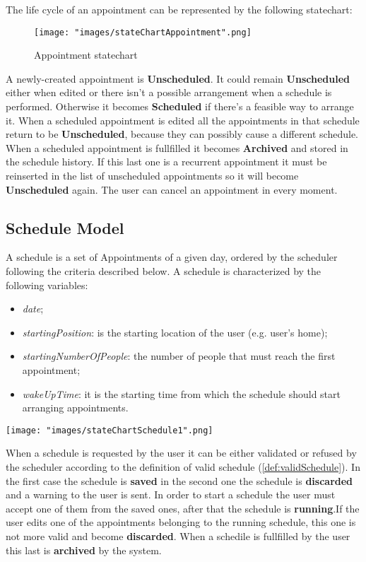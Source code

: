 The life cycle of an appointment can be represented by the following statechart:
\begin{figure}[H]
\begin{center}
\texttt{[image: "images/stateChartAppointment".png]}
\caption{Appointment statechart}
\label{fig:stchartApp}
\end{center}
\end{figure}

A newly-created appointment is \textbf{Unscheduled}. It could remain \textbf{Unscheduled} either when edited or there isn't a possible arrangement when a schedule is performed. Otherwise it becomes \textbf{Scheduled} if there's a feasible way to arrange it. When a scheduled appointment is edited all the appointments in that schedule return to be \textbf{Unscheduled}, because they can possibly cause a different schedule. When a scheduled appointment is fullfilled it becomes \textbf{Archived} and stored in the schedule history. If this last one is a recurrent appointment it must be reinserted in the list of unscheduled appointments so it will become \textbf{Unscheduled} again. The user can cancel an appointment in every moment. 

\subsection{Schedule Model} \label{subsect:schmodel}
A schedule is a set of Appointments of a  given day, ordered by the scheduler following the criteria described below.
A schedule is characterized by the following variables:
\begin{itemize}
\item \textit{date};
\item \textit{startingPosition}: is the starting location of the user (e.g. user's home);
\item \textit{startingNumberOfPeople}: the number of people that must reach the first appointment;
\item \textit{wakeUpTime}: it is the starting time from which the schedule should start arranging appointments.
\end{itemize}

\texttt{[image: "images/stateChartSchedule1".png]}

When a schedule is requested by the user it can be either validated or refused by the scheduler according to the definition of valid schedule (\ref{def:validSchedule}).
In the first case the schedule is \textbf{saved} in the second one the schedule is \textbf{discarded} and a warning to the user is sent. In order to start a schedule the user must accept one of them from the saved ones, after that the schedule is \textbf{running}.If the user edits one of the appointments belonging to the running schedule, this one is not more valid and become \textbf{discarded}. When a schedile is fullfilled by the user this last is \textbf{archived} by the system.

